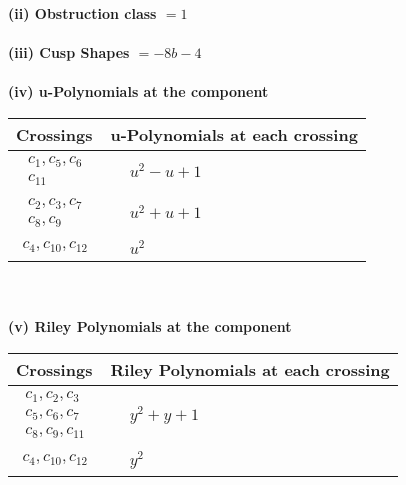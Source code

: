 \documentclass[1p]{elsarticle_modified}
\theoremstyle{definition}
\begin{document}
\flushleft \textbf{(ii) Obstruction class $= 1$}\\~\\
\flushleft \textbf{(iii) Cusp Shapes $= -8 b-4$}\\~\\
\newpage\renewcommand{\arraystretch}{1}
\flushleft \textbf{(iv) u-Polynomials at the component}\newline \\
\begin{tabular}{m{50pt}|m{274pt}}
Crossings & \hspace{64pt}u-Polynomials at each crossing \\
\hline $$\begin{aligned}c_{1},c_{5},c_{6}\\c_{11}\end{aligned}$$&$\begin{aligned}
&u^2- u+1
\end{aligned}$\\
\hline $$\begin{aligned}c_{2},c_{3},c_{7}\\c_{8},c_{9}\end{aligned}$$&$\begin{aligned}
&u^2+u+1
\end{aligned}$\\
\hline $$\begin{aligned}c_{4},c_{10},c_{12}\end{aligned}$$&$\begin{aligned}
&u^2
\end{aligned}$\\
\hline
\end{tabular}\\~\\
\newpage\renewcommand{\arraystretch}{1}
\flushleft \textbf{(v) Riley Polynomials at the component}\newline \\
\begin{tabular}{m{50pt}|m{274pt}}
Crossings & \hspace{64pt}Riley Polynomials at each crossing \\
\hline $$\begin{aligned}c_{1},c_{2},c_{3}\\c_{5},c_{6},c_{7}\\c_{8},c_{9},c_{11}\end{aligned}$$&$\begin{aligned}
&y^2+y+1
\end{aligned}$\\
\hline $$\begin{aligned}c_{4},c_{10},c_{12}\end{aligned}$$&$\begin{aligned}
&y^2
\end{aligned}$\\
\hline
\end{tabular}\\~\\
\end{document}
